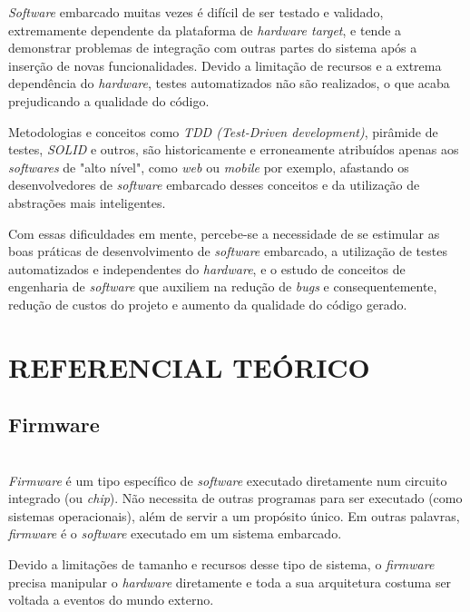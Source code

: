 \documentclass[times, twoside, watermark]{artigo}
\begin{document}
\textit{Software} embarcado muitas vezes é difícil de ser testado e validado, extremamente dependente
da plataforma de \textit{hardware target}, e tende a demonstrar problemas de integração com outras
partes do sistema após a inserção de novas funcionalidades. 
Devido a limitação de recursos e a extrema dependência do \textit{hardware}, testes automatizados 
não são realizados, o que acaba prejudicando a qualidade do código.

Metodologias e conceitos como \textit{TDD (Test-Driven development)}, pirâmide de testes,
\textit{SOLID} e outros, são historicamente e erroneamente atribuídos apenas aos 
\textit{softwares} de "alto nível", como \textit{web} ou 
\textit{mobile} por exemplo, afastando os desenvolvedores de \textit{software} embarcado desses
conceitos e da utilização de abstrações mais inteligentes. 

Com essas dificuldades em mente, percebe-se a necessidade de se estimular as boas práticas de
desenvolvimento de \textit{software} embarcado, a utilização de testes automatizados e independentes
do \textit{hardware}, e o estudo de conceitos de engenharia de \textit{software} que auxiliem na
redução de \textit{bugs} e consequentemente, redução de custos do projeto e aumento da 
qualidade do código gerado. \hfill\\




\section*{REFERENCIAL TEÓRICO}
\subsection{Firmware}\hfill\\

\textit{Firmware} é um tipo específico de \textit{software} executado diretamente
num circuito integrado (ou \textit{chip}). 
Não necessita de outras programas para ser executado (como sistemas operacionais),
além de servir a um propósito único. 
Em outras palavras, \textit{firmware} é o \textit{software} executado em um sistema
 embarcado\cite{ganssle2004firmware}.

Devido a limitações de tamanho e recursos desse tipo de sistema, 
o \textit{firmware} precisa manipular o \textit{hardware} diretamente e toda a sua
 arquitetura costuma ser voltada a eventos do mundo externo.
\end{document}
